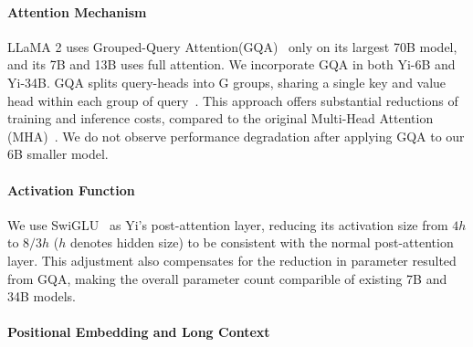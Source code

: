 \paragraph{Attention Mechanism} LLaMA 2 uses Grouped-Query Attention(GQA)~\citep{gqa} only on its largest 70B model, and its 7B and 13B uses full attention. We incorporate GQA in both Yi-6B and Yi-34B. 
GQA splits query-heads into G groups, sharing a single key and value head within each group of query~\citep{gqa}.
This approach offers substantial reductions of training and inference costs, compared to the original Multi-Head Attention (MHA)~\citep{shazeer2019fast,de2022fido,pope2023efficiently}.
We do not observe performance degradation after applying GQA to our 6B smaller model. 


\paragraph{Activation Function} 
We use SwiGLU~\citep{swiglu} as Yi's post-attention layer, reducing its activation size from $4h$ to $8/3h$ ($h$ denotes hidden size) to be consistent with the normal post-attention layer. 
This adjustment also compensates for the reduction in parameter resulted from GQA, making the overall parameter count comparible of existing 7B and 34B models. 


\paragraph{Positional Embedding and Long Context}

